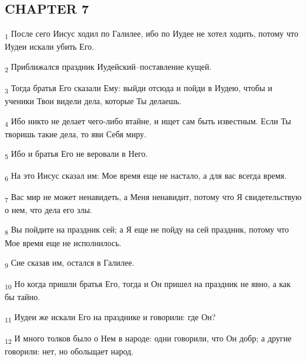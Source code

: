 \subsection{CHAPTER 7}
\begin{tcolorbox}
\textsubscript{1} После сего Иисус ходил по Галилее, ибо по Иудее не хотел ходить, потому что Иудеи искали убить Его.
\end{tcolorbox}
\begin{tcolorbox}
\textsubscript{2} Приближался праздник Иудейский--поставление кущей.
\end{tcolorbox}
\begin{tcolorbox}
\textsubscript{3} Тогда братья Его сказали Ему: выйди отсюда и пойди в Иудею, чтобы и ученики Твои видели дела, которые Ты делаешь.
\end{tcolorbox}
\begin{tcolorbox}
\textsubscript{4} Ибо никто не делает чего-либо втайне, и ищет сам быть известным. Если Ты творишь такие дела, то яви Себя миру.
\end{tcolorbox}
\begin{tcolorbox}
\textsubscript{5} Ибо и братья Его не веровали в Него.
\end{tcolorbox}
\begin{tcolorbox}
\textsubscript{6} На это Иисус сказал им: Мое время еще не настало, а для вас всегда время.
\end{tcolorbox}
\begin{tcolorbox}
\textsubscript{7} Вас мир не может ненавидеть, а Меня ненавидит, потому что Я свидетельствую о нем, что дела его злы.
\end{tcolorbox}
\begin{tcolorbox}
\textsubscript{8} Вы пойдите на праздник сей; а Я еще не пойду на сей праздник, потому что Мое время еще не исполнилось.
\end{tcolorbox}
\begin{tcolorbox}
\textsubscript{9} Сие сказав им, остался в Галилее.
\end{tcolorbox}
\begin{tcolorbox}
\textsubscript{10} Но когда пришли братья Его, тогда и Он пришел на праздник не явно, а как бы тайно.
\end{tcolorbox}
\begin{tcolorbox}
\textsubscript{11} Иудеи же искали Его на празднике и говорили: где Он?
\end{tcolorbox}
\begin{tcolorbox}
\textsubscript{12} И много толков было о Нем в народе: одни говорили, что Он добр; а другие говорили: нет, но обольщает народ.
\end{tcolorbox}
